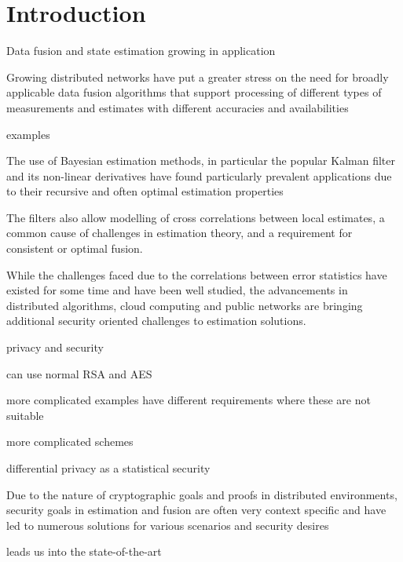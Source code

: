 
\chapter{Introduction}
\cite{andersonOptimalFiltering1979}

Data fusion and state estimation growing in application

Growing distributed networks have put a greater stress on the need for broadly applicable data fusion algorithms that support processing of different types of measurements and estimates with different accuracies and availabilities

examples

The use of Bayesian estimation methods, in particular the popular Kalman filter and its non-linear derivatives have found particularly prevalent applications due to their recursive and often optimal estimation properties 

The filters also allow modelling of cross correlations between local estimates, a common cause of challenges in estimation theory, and a requirement for consistent or optimal fusion.

While the challenges faced due to the correlations between error statistics have existed for some time and have been well studied, the advancements in distributed algorithms, cloud computing and public networks are bringing additional security oriented challenges to estimation solutions.

privacy and security 

can use normal RSA and AES

more complicated examples have different requirements where these are not suitable

more complicated schemes

differential privacy as a statistical security

Due to the nature of cryptographic goals and proofs in distributed environments, security goals in estimation and fusion are often very context specific and have led to numerous solutions for various scenarios and security desires

leads us into the state-of-the-art

% 
%                                             
%                                             
%                                             
% 
